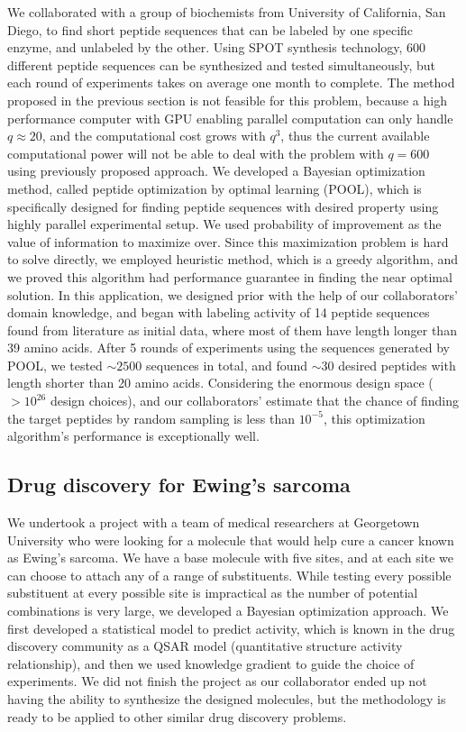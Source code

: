\documentclass[11pt]{article}
\begin{document}
We collaborated with a group of biochemists from University of California, San Diego,
to find short peptide sequences that can be labeled by one specific enzyme, and 
unlabeled by the other. Using SPOT synthesis technology, 600 different
peptide sequences can be synthesized and tested simultaneously, but each round
of experiments takes on average one month to complete. The method proposed in the
previous section is not feasible for this problem, because a high performance
computer with GPU enabling parallel computation can only handle $q \approx 20$,
and the computational cost grows with $q^3$, thus the current available computational power
will not be able to deal with the problem with $q = 600$ using previously proposed approach. 
We developed a Bayesian optimization method, called peptide optimization by optimal learning (POOL),
which is specifically designed for finding peptide sequences with desired
property using highly parallel experimental setup. We used probability of
improvement as the value of information to maximize over. Since this maximization
problem is hard to solve directly, we employed heuristic method, which is
a greedy algorithm, and we proved this algorithm had performance guarantee
in finding the near optimal solution. In this application, we designed prior with
the help of our collaborators' domain knowledge, and began with labeling
activity of 14 peptide sequences found from literature as initial data, where
most of them have length longer than 39 amino acids. After 5 rounds of experiments
using the sequences generated by POOL, we tested $\sim 2500$ sequences in total, and found
$\sim 30$ desired peptides with length shorter than 20 amino acids. Considering the enormous
design space ($>10^{26}$ design choices), and our collaborators' estimate that
the chance of finding the target peptides by random sampling is less than $10^{-5}$, this optimization
algorithm's performance is exceptionally well.

\subsection{Drug discovery for Ewing's sarcoma}
We undertook a project with a team of medical researchers at Georgetown University
who were looking for a molecule that would help cure a cancer known as Ewing's
sarcoma. We have a base molecule with five sites, and at each site we can choose
to attach any of a range of substituents. While testing every possible substituent
at every possible site is impractical as the number of potential combinations is
very large, we developed a Bayesian optimization approach. We first developed a
statistical model to predict activity, which is known in the drug discovery community
as a QSAR model (quantitative structure activity relationship), and then we used
knowledge gradient to guide the choice of experiments. We did not finish the
project as our collaborator ended up not having the ability to synthesize the
designed molecules, but the methodology is ready to be applied to other similar
drug discovery problems.
\end{document}
